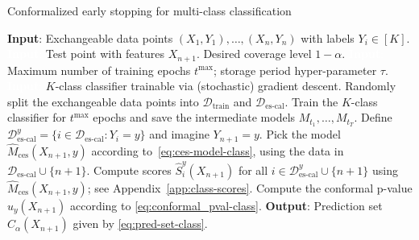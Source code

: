 \begin{algorithm}[H]
    \caption{Conformalized early stopping for multi-class classification}
    \label{alg:class_full_seq}
    \begin{algorithmic}[1]
        \STATE \textbf{Input}: Exchangeable data points $(X_{1},Y_{1}), \ldots, (X_{n},Y_{n})$ with labels $Y_i \in [K]$.
        \STATE \textcolor{white}{\textbf{Input}:} Test point with features $X_{n+1}$. Desired coverage level $1-\alpha$.
        \STATE \textcolor{white}{\textbf{Input}:} Maximum number of training epochs $t^{\text{max}}$; storage period hyper-parameter $\tau$.
        \STATE \textcolor{white}{\textbf{Input}:} $K$-class classifier trainable via (stochastic) gradient descent.
        \STATE Randomly split the exchangeable data points into $\mathcal{D}_{\text{train}}$ and $\mathcal{D}_{\text{es-cal}}$.
        \STATE Train the $K$-class classifier for $t^{\text{max}}$ epochs and save the intermediate models $M_{t_1} , \dots, M_{t_T}$.
        \STATE Define $\mathcal{D}^y_{\text{es-cal}} = \{i \in \mathcal{D}_{\text{es-cal}} : Y_i = y \}$ and imagine $Y_{n+1}=y$.
        \STATE Pick the model $\hat{M}_{\text{ces}}(X_{n+1},y)$ according to~\eqref{eq:ces-model-class}, using the data in $\mathcal{D}_{\text{es-cal}} \cup \{n+1\}$.
        \STATE Compute scores $\hat{S}_i^y(X_{n+1})$ for all $i \in \mathcal{D}^y_{\text{es-cal}} \cup \{n+1\}$ using $\hat{M}_{\text{ces}}(X_{n+1},y)$; see Appendix~\ref{app:class-scores}.
        \STATE Compute the conformal p-value $\hat{u}_y(X_{n+1})$ according to \eqref{eq:conformal_pval-class}.
        \ENDFOR
        \STATE \textbf{Output}: Prediction set $\hat{C}_{\alpha}(X_{n+1})$ given by \eqref{eq:pred-set-class}.
    \end{algorithmic}
\end{algorithm}

